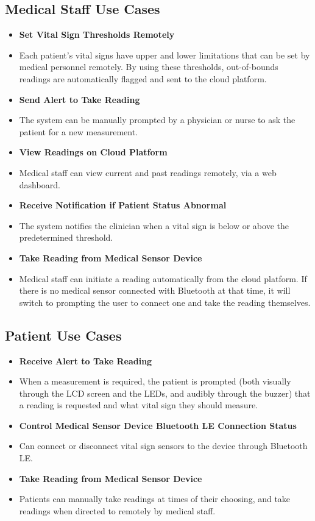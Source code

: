 \subsection{Medical Staff Use Cases}
\begin{itemize}
	\item \textbf{Set Vital Sign Thresholds Remotely}
	\item[] Each patient's vital signs have upper and lower limitations that can be set by medical personnel remotely. By using these thresholds, out-of-bounds readings are automatically flagged and sent to the cloud platform.
	\item \textbf{Send Alert to Take Reading}
	\item[] The system can be manually prompted by a physician or nurse to ask the patient for a new measurement.
	\item \textbf{View Readings on Cloud Platform}
	\item[] Medical staff can view current and past readings remotely, via a web dashboard.
	\item \textbf{Receive Notification if Patient Status Abnormal}
	\item[] The system notifies the clinician when a vital sign is below or above the predetermined threshold.
	\item \textbf{Take Reading from Medical Sensor Device}
	\item[] Medical staff can initiate a reading automatically from the cloud platform. If there is no medical sensor connected with Bluetooth at that time, it will switch to prompting the user to connect one and take the reading themselves.
\end{itemize}

\subsection{Patient Use Cases}
\begin{itemize}
	\item \textbf{Receive Alert to Take Reading}
	\item[] When a measurement is required, the patient is prompted (both visually through the LCD screen and the LEDs, and audibly through the buzzer) that a reading is requested and what vital sign they should measure.
	\item \textbf{Control Medical Sensor Device Bluetooth LE Connection Status}
	\item[] Can connect or disconnect vital sign sensors to the device through Bluetooth LE.
	\item \textbf{Take Reading from Medical Sensor Device}
	\item[] Patients can manually take readings at times of their choosing, and take readings when directed to remotely by medical staff.
\end{itemize}

